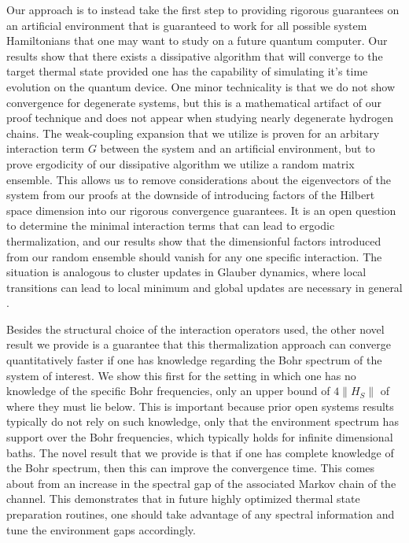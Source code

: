 \documentclass[
 amsmath,amssymb,
 aps,
onecolumn, 
nofootinbib]{revtex4-2}
\begin{document}
Our approach is to instead take the first step to providing rigorous guarantees on an artificial environment that is guaranteed to work for all possible system Hamiltonians that one may want to study on a future quantum computer. Our results show that there exists a dissipative algorithm that will converge to the target thermal state provided one has the capability of simulating it's time evolution on the quantum device. One minor technicality is that we do not show convergence for degenerate systems, but this is a mathematical artifact of our proof technique and does not appear when studying nearly degenerate hydrogen chains. The weak-coupling expansion that we utilize is proven for an arbitary interaction term $G$ between the system and an artificial environment, but to prove ergodicity of our dissipative algorithm we utilize a random matrix ensemble. This allows us to remove considerations about the eigenvectors of the system from our proofs at the downside of introducing factors of the Hilbert space dimension into our rigorous convergence guarantees. It is an open question to determine the minimal interaction terms that can lead to ergodic thermalization, and our results show that the dimensionful factors introduced from our random ensemble should vanish for any one specific interaction. The situation is analogous to cluster updates in Glauber dynamics, where local transitions can lead to local minimum and global updates are necessary in general \cite{swendsen1987nonuniversal}.

Besides the structural choice of the interaction operators used, the other novel result we provide is a guarantee that this thermalization approach can converge quantitatively faster if one has knowledge regarding the Bohr spectrum of the system of interest. We show this first for the setting in which one has no knowledge of the specific Bohr frequencies, only an upper bound of $4 \| H_S\|$ of where they must lie below. This is important because prior open systems results typically do not rely on such knowledge, only that the environment spectrum has support over the Bohr frequencies, which typically holds for infinite dimensional baths. The novel result that we provide is that if one has complete knowledge of the Bohr spectrum, then this can improve the convergence time. This comes about from an increase in the spectral gap of the associated Markov chain of the channel. This demonstrates that in future highly optimized thermal state preparation routines, one should take advantage of any spectral information and tune the environment gaps accordingly. 
\end{document}
